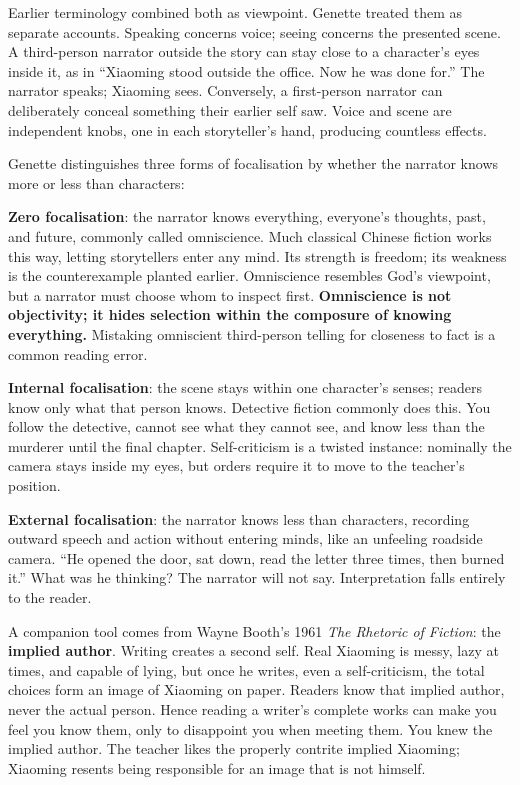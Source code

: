 Earlier terminology combined both as viewpoint. Genette treated them as separate accounts. Speaking concerns voice; seeing concerns the presented scene. A third-person narrator outside the story can stay close to a character's eyes inside it, as in ``Xiaoming stood outside the office. Now he was done for.'' The narrator speaks; Xiaoming sees. Conversely, a first-person narrator can deliberately conceal something their earlier self saw. Voice and scene are independent knobs, one in each storyteller's hand, producing countless effects.

Genette distinguishes three forms of focalisation by whether the narrator knows more or less than characters:

\textbf{Zero focalisation}: the narrator knows everything, everyone's thoughts, past, and future, commonly called omniscience. Much classical Chinese fiction works this way, letting storytellers enter any mind. Its strength is freedom; its weakness is the counterexample planted earlier. Omniscience resembles God's viewpoint, but a narrator must choose whom to inspect first. \textbf{Omniscience is not objectivity; it hides selection within the composure of knowing everything.} Mistaking omniscient third-person telling for closeness to fact is a common reading error.

\textbf{Internal focalisation}: the scene stays within one character's senses; readers know only what that person knows. Detective fiction commonly does this. You follow the detective, cannot see what they cannot see, and know less than the murderer until the final chapter. Self-criticism is a twisted instance: nominally the camera stays inside my eyes, but orders require it to move to the teacher's position.

\textbf{External focalisation}: the narrator knows less than characters, recording outward speech and action without entering minds, like an unfeeling roadside camera. ``He opened the door, sat down, read the letter three times, then burned it.'' What was he thinking? The narrator will not say. Interpretation falls entirely to the reader.

A companion tool comes from Wayne Booth's 1961 \emph{The Rhetoric of Fiction}: the \textbf{implied author}. Writing creates a second self. Real Xiaoming is messy, lazy at times, and capable of lying, but once he writes, even a self-criticism, the total choices form an image of Xiaoming on paper. Readers know that implied author, never the actual person. Hence reading a writer's complete works can make you feel you know them, only to disappoint you when meeting them. You knew the implied author. The teacher likes the properly contrite implied Xiaoming; Xiaoming resents being responsible for an image that is not himself.

